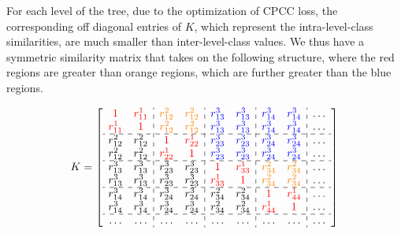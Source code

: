 For each level of the tree, due to the optimization of CPCC loss, the corresponding off diagonal entries of $K$, which represent the intra-level-class similarities, are much smaller than inter-level-class values. We thus have a symmetric similarity matrix that takes on the following structure, where the red regions are greater than orange regions, which are further greater than the blue regions.

\begin{equation*}
    K = \left[\begin{array}{cc:cc:cc:cc:c}
\textcolor{red}{1} & \textcolor{red}{r_{11}^1}  & \textcolor{orange}{r_{12}^2} & \textcolor{orange}{r_{12}^2} & \textcolor{blue}{r_{13}^3} & \textcolor{blue}{r_{13}^3} & \textcolor{blue}{r_{14}^3} & \textcolor{blue}{r_{14}^3} & \dots \\
\textcolor{red}{r_{11}^1} & \textcolor{red}{1}  & \textcolor{orange}{r_{12}^2} & \textcolor{orange}{r_{12}^2} & \textcolor{blue}{r_{13}^3} & \textcolor{blue}{r_{13}^3} & \textcolor{blue}{r_{14}^3} & \textcolor{blue}{r_{14}^3} & \dots \\ \hdashline
r_{12}^2 & r_{12}^2 & \textcolor{red}{1}  & \textcolor{red}{r_{22}^1} & \textcolor{blue}{r_{23}^3} & \textcolor{blue}{r_{23}^3} & \textcolor{blue}{r_{24}^3} & \textcolor{blue}{r_{24}^3} & \dots \\
r_{12}^2 & r_{12}^2 & \textcolor{red}{r_{22}^1}  & \textcolor{red}{1} & \textcolor{blue}{r_{23}^3} & \textcolor{blue}{r_{23}^3} & \textcolor{blue}{r_{24}^3} & \textcolor{blue}{r_{24}^3} & \dots \\ \hdashline
r_{13}^3 & r_{13}^3 & r_{23}^3  & r_{23}^3 & \textcolor{red}{1} & \textcolor{red}{r_{33}^1} & \textcolor{orange}{r_{34}^2} & \textcolor{orange}{r_{34}^2} & \dots \\

r_{13}^3 & r_{13}^3 &  r_{23}^3 & r_{23}^3 & \textcolor{red}{r_{33}^1} & \textcolor{red}{1} & \textcolor{orange}{r_{34}^2}  & \textcolor{orange}{r_{34}^2}  & \dots \\ \hdashline
r_{14}^3 & r_{14}^3 &  r_{24}^3  & r_{24}^3 & r_{34}^2 & r_{34}^2 & \textcolor{red}{1} & \textcolor{red}{r_{44}^1} & \dots \\
r_{14}^3 & r_{14}^3 &  r_{24}^3 & r_{24}^3 & r_{34}^2 & r_{34}^2 & \textcolor{red}{r_{44}^1}  & \textcolor{red}{1} & \dots \\ \hdashline
\dots & \dots & \dots & \dots & \dots & \dots & \dots & \dots & \dots
\end{array}\right]
\end{equation*}

